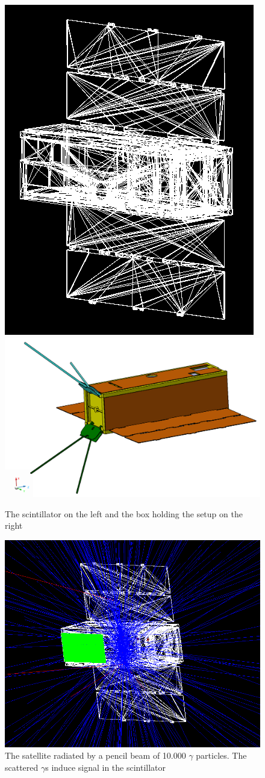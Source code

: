 \documentclass[12pt, a4paper,titlepage]{article}
\numberwithin{equation}{section}
\numberwithin{figure}{section}
\begin{document}
\begin{figure}[htbp]
 \centering %
 \includegraphics[width=.3\textwidth,origin=c,angle=0]{images/satellite.png}
 \qquad
 \includegraphics[width=.5\textwidth,origin=c,angle=90]{images/cad_sat.png} 
 \caption{\label{fig:i} The scintillator on the left and the box holding the setup on the right}
 \end{figure}

\begin{figure}
\includegraphics[width=150.0mm]{images/satellite_rad.png}
\caption{The satellite radiated by a pencil beam of 10.000 $\gamma$ particles. The scattered $\gamma$s induce signal in the scintillator}
\end{figure}
\end{document}

